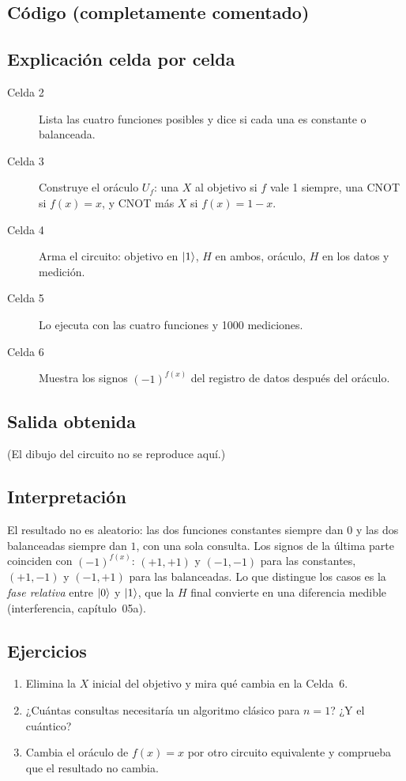 \subsection{Código (completamente comentado)}


\subsection{Explicación celda por celda}
\begin{description}
  \item[Celda 2] Lista las cuatro funciones posibles y dice si cada una es
    constante o balanceada.
  \item[Celda 3] Construye el oráculo $U_f$: una $X$ al objetivo si $f$ vale 1
    siempre, una CNOT si $f(x)=x$, y CNOT más $X$ si $f(x)=1-x$.
  \item[Celda 4] Arma el circuito: objetivo en $\left|1\right\rangle$, $H$ en ambos, oráculo,
    $H$ en los datos y medición.
  \item[Celda 5] Lo ejecuta con las cuatro funciones y 1000 mediciones.
  \item[Celda 6] Muestra los signos $(-1)^{f(x)}$ del registro de datos
    después del oráculo.
\end{description}

\subsection{Salida obtenida}

(El dibujo del circuito no se reproduce aquí.)

\subsection{Interpretación}
El resultado no es aleatorio: las dos funciones constantes siempre dan $0$ y las
dos balanceadas siempre dan $1$, con una sola consulta. Los signos de la última
parte coinciden con $(-1)^{f(x)}$: $(+1,+1)$ y $(-1,-1)$ para las constantes,
$(+1,-1)$ y $(-1,+1)$ para las balanceadas. Lo que distingue los casos es la
\emph{fase relativa} entre $\left|0\right\rangle$ y $\left|1\right\rangle$, que la $H$ final convierte en
una diferencia medible (interferencia, capítulo~05a).

\subsection{Ejercicios}
\begin{enumerate}
  \item Elimina la $X$ inicial del objetivo y mira qué cambia en la
    Celda~6.
  \item ¿Cuántas consultas necesitaría un algoritmo clásico para $n=1$? ¿Y
    el cuántico?
  \item Cambia el oráculo de $f(x)=x$ por otro circuito equivalente y comprueba que
    el resultado no cambia.
\end{enumerate}

